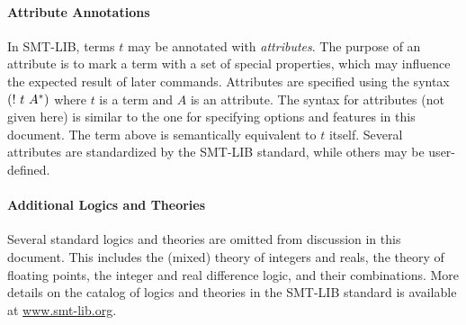 \documentclass[english,a4paper,10pt]{article}
\begin{document}
\begin{appendix}

\paragraph{Attribute Annotations}
In SMT-LIB,
terms $t$ may be annotated with \emph{attributes}.
The purpose of an attribute is to mark a term with a set of special properties, 
which may influence the expected result of later commands.
Attributes are specified using the
syntax ${\tt (}!\mbox{ }t\mbox{ }A^{*}{\tt )}$
where $t$ is a term and $A$ is an attribute.
The syntax for attributes (not given here) is similar to the one
for specifying options and features in this document.
The term above is semantically equivalent to $t$ itself.
Several attributes are standardized by the SMT-LIB standard, while
others may be user-defined.

\paragraph{Additional Logics and Theories}
Several standard logics and theories are omitted from discussion in this document.
This includes the (mixed) theory of integers and reals,
the theory of floating points,
the integer and real difference logic,
and their combinations.
More details on the catalog of logics and theories in the SMT-LIB standard
is available at \url{www.smt-lib.org}.

\end{appendix}
\end{document}
